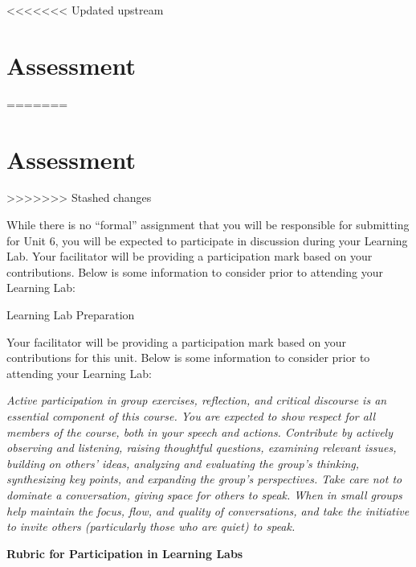 \documentclass[
]{book}
\begin{document}
<<<<<<< Updated upstream
\hypertarget{assessment-5}{%
\section*{Assessment}\label{assessment-5}}
=======
\hypertarget{assessment-4}{%
\section*{Assessment}\label{assessment-4}}
>>>>>>> Stashed changes

\begin{assessment}
While there is no ``formal'' assignment that you will be responsible for submitting for Unit 6, you will be expected to participate in discussion during your Learning Lab. Your facilitator will be providing a participation mark based on your contributions. Below is some information to consider prior to attending your Learning Lab:

{Learning Lab Preparation}

Your facilitator will be providing a participation mark based on your contributions for this unit. Below is some information to consider prior to attending your Learning Lab:

\emph{Active participation in group exercises, reflection, and critical discourse is an essential component of this course. You are expected to show respect for all members of the course, both in your speech and actions. Contribute by actively observing and listening, raising thoughtful questions, examining relevant issues, building on others' ideas, analyzing and evaluating the group's thinking, synthesizing key points, and expanding the group's perspectives. Take care not to dominate a conversation, giving space for others to speak. When in small groups help maintain the focus, flow, and quality of conversations, and take the initiative to invite others (particularly those who are quiet) to speak.}

\textbf{Rubric for Participation in Learning Labs}


\end{assessment}
\end{document}
